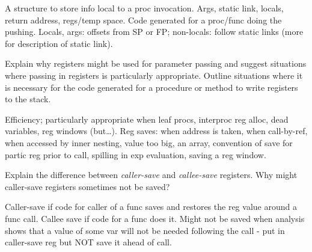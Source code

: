 \documentclass[11pt]{bareexam}
\begin{document}
\begin{questions}
\begin{subquestions}
\begin{modelanswer}
A structure to store info local to a proc invocation.
Args, static link, locals, return address, regs/temp space.
Code generated for a proc/func doing the pushing.
Locals, args: offsets from SP or FP; non-locals: follow static links
(more for description of static link).
\end{modelanswer}

\subquestion
Explain why registers might be used for parameter passing and
suggest situations where passing in registers is particularly
appropriate. 
Outline situations where it is necessary for the code generated for a 
procedure or method to write registers to the stack.

\begin{modelanswer}
Efficiency; particularly appropriate when leaf procs, interproc
reg alloc, dead variables, reg windows (but\ldots).
Reg saves: when address is taken,
when call-by-ref,
when accessed by inner nesting,
value too big,
an array,
convention of save for partic reg prior to call,
spilling in exp evaluation,
saving a reg window.
\end{modelanswer}

\subquestion
Explain the difference between \emph{caller-save\/} and \emph{callee-save\/}
registers. Why might caller-save registers sometimes not be saved?
\end{subquestions}

\begin{modelanswer}
Caller-save if code for caller of a func saves and restores the reg value
around a func call. Callee save if code for a func does it. Might not be
saved when analysis shows that a value of some var will not be needed following
the call - put in caller-save reg but NOT save it ahead of call.
\end{modelanswer}

\end{questions}
\end{document}
